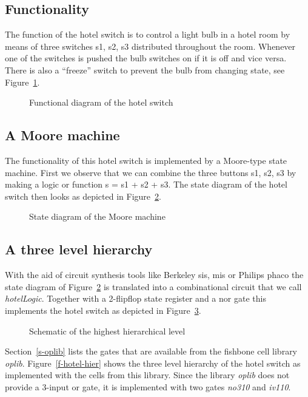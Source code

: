 \subsection{Functionality}
The function of the hotel switch is to control a light bulb in a hotel room by
means of three switches s1, s2, s3 distributed throughout the room. Whenever
one of the switches is pushed the bulb switches on if it is off and vice versa.
There is also a ``freeze'' switch to prevent the bulb from changing state, see
Figure~\ref{f-hotel-sch}.

\begin{figure}[hbt]
\centerline{}
\caption{Functional diagram of the hotel switch}
\label{f-hotel-sch}
\end{figure}

\subsection{A Moore machine}
The functionality of this hotel switch is implemented by a Moore-type state
machine. First we observe that we can combine the three buttons s1, s2, s3 by
making a logic {\sc or} function s = s1 + s2 + s3. The state diagram of the
hotel switch then looks as depicted in Figure~\ref{f-hotel-state}.

\begin{figure}[hbt]
\centerline{}
\caption{State diagram of the Moore machine}
\label{f-hotel-state}
\end{figure}

\subsection{A three level hierarchy}
\label{s-hierarchy}
With the aid of circuit synthesis tools like Berkeley {\sc sis}, {\sc mis} or
Philips {\sc phaco} the state diagram of Figure~\ref{f-hotel-state} is
translated into a combinational circuit that we call {\sl hotelLogic}. Together
with a 2-flipflop state register and a {\sc nor} gate this implements the hotel
switch as depicted in Figure~\ref{f-hotel-sch2}.

\begin{figure}[hbt]
\centerline{}
\caption{Schematic of the highest hierarchical level}
\label{f-hotel-sch2}
\end{figure}

Section~\ref{s-oplib} lists the gates that are available from the fishbone cell
library {\sl oplib}. Figure~\ref{f-hotel-hier} shows the three level hierarchy
of the hotel switch as implemented with the cells from this library.  Since the
library {\sl oplib} does not provide a 3-input {\sc or} gate, it is implemented
with two gates {\sl no310} and {\sl iv110}.

